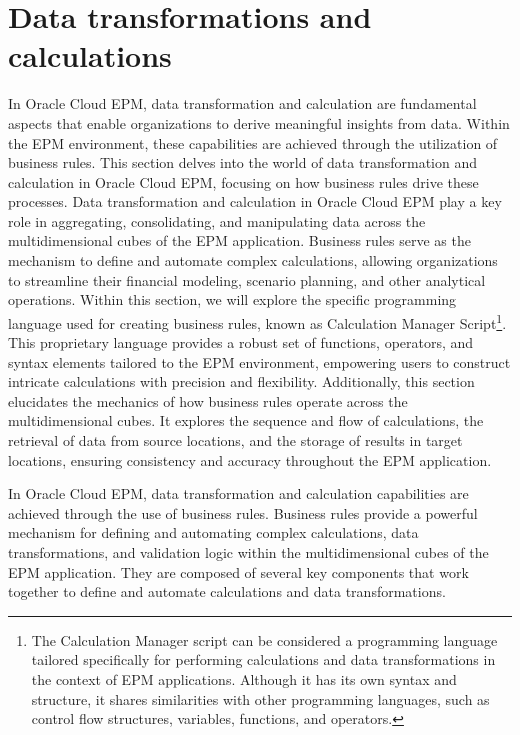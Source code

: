 \documentclass[12pt,a4paper,openright,twoside]{book}
\begin{document}
\section{Data transformations and calculations}

In Oracle Cloud EPM, data transformation and calculation are fundamental aspects that enable organizations to derive meaningful insights from data. 
%
Within the EPM environment, these capabilities are achieved through the utilization of business rules.
%
This section delves into the world of data transformation and calculation in Oracle Cloud EPM, focusing on how business rules drive these processes.
%
Data transformation and calculation in Oracle Cloud EPM play a key role in aggregating, consolidating, and manipulating data across the multidimensional cubes of the EPM application.
%
Business rules serve as the mechanism to define and automate complex calculations, allowing organizations to streamline their financial modeling, scenario planning, and other analytical operations.
%
Within this section, we will explore the specific programming language used for creating business rules, known as Calculation Manager Script\footnote{The Calculation Manager script can be considered a programming language tailored specifically for performing calculations and data transformations in the context of EPM applications. Although it has its own syntax and structure, it shares similarities with other programming languages, such as control flow structures, variables, functions, and operators.}. 
%
This proprietary language provides a robust set of functions, operators, and syntax elements tailored to the EPM environment, empowering users to construct intricate calculations with precision and flexibility.
%
Additionally, this section elucidates the mechanics of how business rules operate across the multidimensional cubes. 
%
It explores the sequence and flow of calculations, the retrieval of data from source locations, and the storage of results in target locations, ensuring consistency and accuracy throughout the EPM application.

In Oracle Cloud EPM, data transformation and calculation capabilities are achieved through the use of business rules. 
%
Business rules provide a powerful mechanism for defining and automating complex calculations, data transformations, and validation logic within the multidimensional cubes of the EPM application.
%
They are composed of several key components that work together to define and automate calculations and data transformations. 
\end{document}
